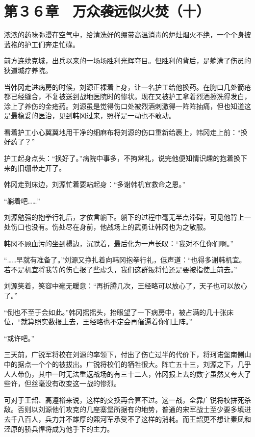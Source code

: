 \section{第３６章　万众袭远似火焚（十）}

浓浓的药味弥漫在空气中，给清洗好的绷带高温消毒的炉灶烟火不绝，一个个身披蓝袍的护工们奔走忙碌。

前方连续克城，出兵以来的一场场胜利光辉夺目。但胜利的背后，是躺满了伤员的狄道城疗养院。

当韩冈走进病房的时候，刘源正裸着上身，让一名护工给他换药。在胸口几处箭疮都已经缝合，不复被送到战地医院时的惨状。现在又被护工拿着烈酒擦洗得发白，涂上了养伤的金疮药。刘源虽是觉得伤口处被烈酒刺激得一阵阵抽痛，但也知道这是最稳妥的医治，见到韩冈过来，照样是一动也不敢动。

看着护工小心翼翼地用干净的细麻布将刘源的伤口重新给裹上，韩冈走上前：“换好药了？”

护工起身点头：“换好了。”病院中事多，不拘常礼，说完他便知情识趣的抱着换下来的旧绷带走开了。

韩冈走到床边，刘源忙着要站起身：“多谢韩机宜救命之恩。”

“躺着吧……”

刘源勉强的抱拳行礼后，才依言躺下。躺下的过程中毫无半点滞碍，可见他背上一处伤口也没有。伤处尽在身前，他战场上的武勇让韩冈也为之敬服。

韩冈不顾血污的坐到榻边，沉默着，最后化为一声长叹：“我对不住你们啊。”

“……早就有准备了。”刘源又挣扎着向韩冈抱拳行礼，低声道：“也得多谢韩机宜。若不是机宜将我等的伤亡报了些虚头，我们这群叛将怕还是要被指使上前去。”

刘源笑着，笑容中毫无暖意：“再折腾几次，王经略可以放心了，天子也可以放心了。”

“倒也不至于会如此。”韩冈摇摇头，抬眼望了一下病房中，被占满的几十张床位，“就算照实数报上去，王经略也不定会再催逼着你们上阵。”

“或许吧。”

三天前，广锐军将校在刘源的率领下，付出了伤亡过半的代价下，将珂诺堡南侧山中的据点一个个的被拔出。广锐将校们的牺牲很大。阵亡五十三，刘源之下，几乎人人带伤，其中一时无法重返战场的有三十二人，韩冈报上去的数字虽然又夸大了些许，但丝毫没有改变这一战的惨烈。

可对于王韶、高遵裕来说，这样的交换再合算不过。这一战，全靠广锐将校拼死杀敌。否则以刘源他们攻克的几座寨堡所据有的地势，普通的宋军战士至少要多填进去千八百人，兵力并不雄厚的熙河军承受不了这样的消耗。而王韶更不想让秦凤和泾原的骄兵悍将成为他手下的主力。


